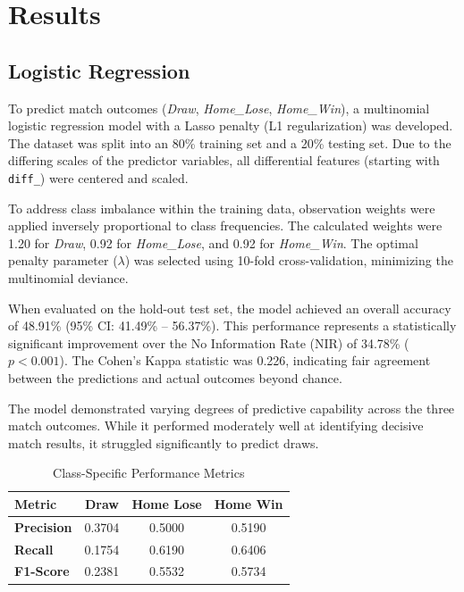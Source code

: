 \documentclass[11pt]{article}
\begin{document}
\section{Results}

\subsection{Logistic Regression}

To predict match outcomes (\textit{Draw}, \textit{Home\_Lose}, \textit{Home\_Win}), a multinomial logistic regression model with a Lasso penalty (L1 regularization) was developed. The dataset was split into an 80\% training set and a 20\% testing set. Due to the differing scales of the predictor variables, all differential features (starting with \texttt{diff\_}) were centered and scaled. 

To address class imbalance within the training data, observation weights were applied inversely proportional to class frequencies. The calculated weights were 1.20 for \textit{Draw}, 0.92 for \textit{Home\_Lose}, and 0.92 for \textit{Home\_Win}. The optimal penalty parameter ($\lambda$) was selected using 10-fold cross-validation, minimizing the multinomial deviance.

When evaluated on the hold-out test set, the model achieved an overall accuracy of 48.91\% (95\% CI: 41.49\% -- 56.37\%). This performance represents a statistically significant improvement over the No Information Rate (NIR) of 34.78\% ($p < 0.001$). The Cohen's Kappa statistic was 0.226, indicating fair agreement between the predictions and actual outcomes beyond chance.

The model demonstrated varying degrees of predictive capability across the three match outcomes. While it performed moderately well at identifying decisive match results, it struggled significantly to predict draws. 

\begin{table}[h!]
\centering
\begin{tabular}{lccc}
\hline
\textbf{Metric} & \textbf{Draw} & \textbf{Home Lose} & \textbf{Home Win} \\
\hline
\textbf{Precision} & 0.3704 & 0.5000 & 0.5190 \\
\textbf{Recall}    & 0.1754 & 0.6190 & 0.6406 \\
\textbf{F1-Score}  & 0.2381 & 0.5532 & 0.5734 \\
\hline
\end{tabular}
\caption{Class-Specific Performance Metrics}
\label{tab:class_metrics}
\end{table}
\end{document}
